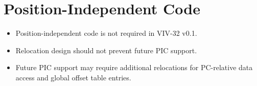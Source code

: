 \section{Position-Independent Code}

\begin{itemize}
  \item Position-independent code is not required in VIV-32 v0.1.
  \item Relocation design should not prevent future PIC support.
  \item Future PIC support may require additional relocations for PC-relative data access and global offset table entries.
\end{itemize}
